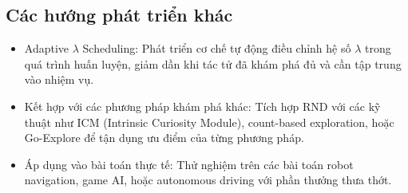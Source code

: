 \documentclass{uetgraduation}
\begin{document}
\subsection{Các hướng phát triển khác}

\begin{itemize}
    \item Adaptive $\lambda$ Scheduling: Phát triển cơ chế tự động điều chỉnh hệ số $\lambda$ trong quá trình huấn luyện, giảm dần khi tác tử đã khám phá đủ và cần tập trung vào nhiệm vụ.
    
    \item Kết hợp với các phương pháp khám phá khác: Tích hợp RND với các kỹ thuật như ICM (Intrinsic Curiosity Module), count-based exploration, hoặc Go-Explore để tận dụng ưu điểm của từng phương pháp.
    
    \item Áp dụng vào bài toán thực tế: Thử nghiệm trên các bài toán robot navigation, game AI, hoặc autonomous driving với phần thưởng thưa thớt.
\end{itemize}
\end{document}
